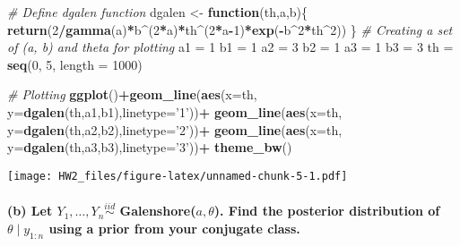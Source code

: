 \documentclass[]{article}
\newenvironment{Shaded}{\begin{snugshade}}{\end{snugshade}}
\newcommand{\KeywordTok}[1]{\textcolor[rgb]{0.13,0.29,0.53}{\textbf{#1}}}
\newcommand{\DataTypeTok}[1]{\textcolor[rgb]{0.13,0.29,0.53}{#1}}
\newcommand{\DecValTok}[1]{\textcolor[rgb]{0.00,0.00,0.81}{#1}}
\newcommand{\StringTok}[1]{\textcolor[rgb]{0.31,0.60,0.02}{#1}}
\newcommand{\CommentTok}[1]{\textcolor[rgb]{0.56,0.35,0.01}{\textit{#1}}}
\newcommand{\ControlFlowTok}[1]{\textcolor[rgb]{0.13,0.29,0.53}{\textbf{#1}}}
\newcommand{\OperatorTok}[1]{\textcolor[rgb]{0.81,0.36,0.00}{\textbf{#1}}}
\newcommand{\NormalTok}[1]{#1}
\let\oldparagraph\paragraph
\renewcommand{\paragraph}[1]{\oldparagraph{#1}\mbox{}}
\begin{document}
\begin{Shaded}
\begin{Highlighting}[]
\CommentTok{# Define dgalen function}
\NormalTok{dgalen <-}\StringTok{ }\ControlFlowTok{function}\NormalTok{(th,a,b)\{}
  \KeywordTok{return}\NormalTok{(}\DecValTok{2}\OperatorTok{/}\KeywordTok{gamma}\NormalTok{(a)}\OperatorTok{*}\NormalTok{b}\OperatorTok{^}\NormalTok{(}\DecValTok{2}\OperatorTok{*}\NormalTok{a)}\OperatorTok{*}\NormalTok{th}\OperatorTok{^}\NormalTok{(}\DecValTok{2}\OperatorTok{*}\NormalTok{a}\OperatorTok{-}\DecValTok{1}\NormalTok{)}\OperatorTok{*}\KeywordTok{exp}\NormalTok{(}\OperatorTok{-}\NormalTok{b}\OperatorTok{^}\DecValTok{2}\OperatorTok{*}\NormalTok{th}\OperatorTok{^}\DecValTok{2}\NormalTok{))}
\NormalTok{\}}
\CommentTok{# Creating a set of (a, b) and theta for plotting}
\NormalTok{a1 =}\StringTok{ }\DecValTok{1}
\NormalTok{b1 =}\StringTok{ }\DecValTok{1}
\NormalTok{a2 =}\StringTok{ }\DecValTok{3}
\NormalTok{b2 =}\StringTok{ }\DecValTok{1}
\NormalTok{a3 =}\StringTok{ }\DecValTok{1}
\NormalTok{b3 =}\StringTok{ }\DecValTok{3}
\NormalTok{th =}\StringTok{ }\KeywordTok{seq}\NormalTok{(}\DecValTok{0}\NormalTok{, }\DecValTok{5}\NormalTok{, }\DataTypeTok{length =} \DecValTok{1000}\NormalTok{)}

\CommentTok{# Plotting}
\KeywordTok{ggplot}\NormalTok{()}\OperatorTok{+}\KeywordTok{geom_line}\NormalTok{(}\KeywordTok{aes}\NormalTok{(}\DataTypeTok{x=}\NormalTok{th, }\DataTypeTok{y=}\KeywordTok{dgalen}\NormalTok{(th,a1,b1),}\DataTypeTok{linetype=}\StringTok{'1'}\NormalTok{))}\OperatorTok{+}
\StringTok{  }\KeywordTok{geom_line}\NormalTok{(}\KeywordTok{aes}\NormalTok{(}\DataTypeTok{x=}\NormalTok{th, }\DataTypeTok{y=}\KeywordTok{dgalen}\NormalTok{(th,a2,b2),}\DataTypeTok{linetype=}\StringTok{'2'}\NormalTok{))}\OperatorTok{+}
\StringTok{  }\KeywordTok{geom_line}\NormalTok{(}\KeywordTok{aes}\NormalTok{(}\DataTypeTok{x=}\NormalTok{th, }\DataTypeTok{y=}\KeywordTok{dgalen}\NormalTok{(th,a3,b3),}\DataTypeTok{linetype=}\StringTok{'3'}\NormalTok{))}\OperatorTok{+}
\StringTok{  }\KeywordTok{theme_bw}\NormalTok{()}
\end{Highlighting}
\end{Shaded}

\texttt{[image: HW2\_files/figure-latex/unnamed-chunk-5-1.pdf]}

\paragraph{\texorpdfstring{(b) Let
\(Y_1, \ldots, Y_n \stackrel{iid}{\sim}\) Galenshore(\(a, \theta\)).
Find the posterior distribution of \(\theta \mid y_{1:n}\) using a prior
from your conjugate
class.}{(b) Let Y\_1, \textbackslash{}ldots, Y\_n \textbackslash{}stackrel\{iid\}\{\textbackslash{}sim\} Galenshore(a, \textbackslash{}theta). Find the posterior distribution of \textbackslash{}theta \textbackslash{}mid y\_\{1:n\} using a prior from your conjugate class.}}\label{b-let-y_1-ldots-y_n-stackreliidsim-galenshorea-theta.-find-the-posterior-distribution-of-theta-mid-y_1n-using-a-prior-from-your-conjugate-class.}
\end{document}
